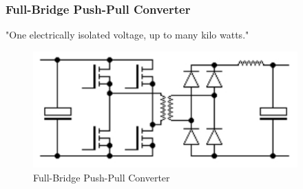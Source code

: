 \subsubsection{Full-Bridge Push-Pull Converter}
 "One electrically isolated voltage, up to many kilo watts."\cite{SMPSD}
\begin{figure}[H]
\begin{center}
\includegraphics[width=4in]{includes/FullBridgePushPullC}
\caption{Full-Bridge Push-Pull Converter}
\label{fig:1}
\end{center}
\end{figure}


